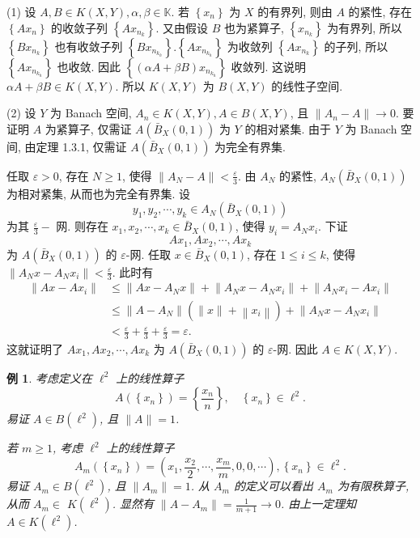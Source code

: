\documentclass[openany]{ctexbook}
\makeatletter
\theoremstyle{kaiti}
\theoremstyle{normal}
\newtheorem{example}{例}[section]
\renewenvironment{proof}[1][\proofname]{\par
    \pushQED{\qed}%
    \normalfont \topsep6\p@\@plus6\p@\relax
    \trivlist
    \item\relax
    {\heiti #1}\hspace{2\labelsep}\ignorespaces
  }{%
    \popQED\endtrivlist\@endpefalse
  }
\makeatother
\begin{document}
\begin{proof}
(1) 设 $A, B \in K(X, Y), \alpha, \beta \in \mathbb{K}$. 若 $\left\{x_n\right\}$ 为 $X$ 的有界列, 则由 $A$ 的紧性, 存在 $\left\{A x_n\right\}$ 的收敛子列 $\left\{A x_{n_{k}}\right\}$. 又由假设 $B$ 也为紧算子, $\left\{x_{n_{k}}\right\}$ 为有界列, 所以 $\left\{B x_{n_{k}}\right\}$ 也有收敛子列 $\left\{B x_{n_{k_{h}}}\right\}.\left\{A x_{n_{k_{h}}}\right\}$ 为收敛列 $\left\{A x_{n_{k}}\right\}$ 的子列, 所以 $\left\{A x_{n_{k_{h}}}\right\}$ 也收敛. 因此 $\left\{(\alpha A+\beta B) x_{n_{k_{h}}}\right\}$ 收敛列. 这说明 $\alpha A+\beta B \in K(X, Y)$. 所以 $K(X, Y)$ 为 $B(X, Y)$ 的线性子空间.

(2) 设 $Y$ 为 Banach 空间, $A_n \in K(X, Y), A \in B(X, Y)$, 且 $\left\|A_n-A\right\| \rightarrow 0$. 要证明 $A$ 为紧算子, 仅需证 $A\left(\bar{B}_{X}(0,1)\right)$ 为 $Y$ 的相对紧集. 由于 $Y$ 为 Banach 空间, 由定理 1.3.1, 仅需证 $A\left(\bar{B}_{X}(0,1)\right)$ 为完全有界集.

任取 $\varepsilon>0$, 存在 $N \geqslant 1$, 使得 $\left\|A_{N}-A\right\|<\frac{\varepsilon}{3}$. 由 $A_{N}$ 的紧性, $A_{N}\left(\bar{B}_{X}(0,1)\right)$ 为相对紧集, 从而也为完全有界集. 设
$$
y_1, y_2, \cdots, y_{k} \in A_{N}\left(\bar{B}_{X}(0,1)\right)
$$
为其 $\frac{\varepsilon}{3}-$ 网. 则存在 $x_1, x_2, \cdots, x_{k} \in \bar{B}_{X}(0,1)$, 使得 $y_{i}=A_{N} x_{i}$. 下证
$$
A x_1, A x_2, \cdots, A x_{k}
$$
为 $A\left(\bar{B}_{X}(0,1)\right)$ 的 $\varepsilon$-网.
任取 $x \in \bar{B}_{X}(0,1)$, 存在 $1 \leqslant i \leqslant k$, 使得 $\left\|A_{N} x-A_{N} x_{i}\right\|<\frac{\varepsilon}{3}$. 此时有
$$
\begin{aligned}
\left\|A x-A x_{i}\right\| & \leqslant\left\|A x-A_{N} x\right\|+\left\|A_{N} x-A_{N} x_{i}\right\|+\left\|A_{N} x_{i}-A x_{i}\right\| \\
& \leqslant\left\|A-A_{N}\right\|\left(\|x\|+\left\|x_{i}\right\|\right)+\left\|A_{N} x-A_{N} x_{i}\right\| \\
&<\frac{\varepsilon}{3}+\frac{\varepsilon}{3}+\frac{\varepsilon}{3}=\varepsilon.
\end{aligned}
$$
这就证明了 $A x_1, A x_2, \cdots, A x_{k}$ 为 $A\left(\bar{B}_{X}(0,1)\right)$ 的 $\varepsilon$-网. 因此 $A \in K(X, Y)$.
\end{proof}

\begin{example}
考虑定义在 $\ell^2$ 上的线性算子
$$
A\left(\left\{x_n\right\}\right)=\left\{\frac{x_n}{n}\right\}, \quad\left\{x_n\right\} \in \ell^2.
$$
易证 $A \in B\left(\ell^2\right)$, 且 $\|A\|=1$.

若 $m \geqslant 1$, 考虑 $\ell^2$ 上的线性算子
$$
A_m\left(\left\{x_n\right\}\right)=\left(x_1, \frac{x_2}{2}, \cdots, \frac{x_m}{m}, 0,0, \cdots\right),\left\{x_n\right\} \in \ell^2.
$$
易证 $A_m \in B\left(\ell^2\right)$, 且 $\left\|A_m\right\|=1$. 从 $A_m$ 的定义可以看出 $A_m$ 为有限秩算子, 从而 $A_m \in$ $K\left(\ell^2\right)$. 显然有 $\left\|A-A_m\right\|=\frac{1}{m+1} \rightarrow 0$. 由上一定理知 $A \in K\left(\ell^2\right)$.
\end{example}
\end{document}
